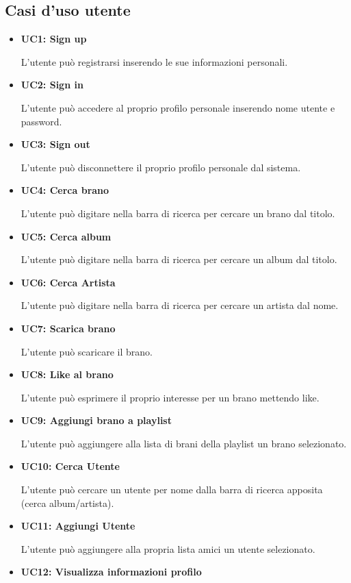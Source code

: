 \subsection{Casi d'uso utente}
\begin{itemize}
      \item \textbf{UC1: Sign up} 
            
      L'utente può registrarsi inserendo le sue informazioni personali.
      \item \textbf{UC2: Sign in}
      
      L'utente può accedere al proprio profilo personale inserendo nome utente e password.
      \item \textbf{UC3: Sign out} 
      
      L'utente può disconnettere il proprio profilo personale dal sistema.     
      \item \textbf{UC4: Cerca brano}
      
      L'utente può digitare nella barra di ricerca per cercare un brano dal titolo.
      \item \textbf{UC5: Cerca album}
      
      L'utente può digitare nella barra di ricerca per cercare un album dal titolo.
      \item \textbf{UC6: Cerca Artista}
      
      L'utente può digitare nella barra di ricerca per cercare un artista dal nome.
      \item \textbf{UC7: Scarica brano}
      
      L'utente può scaricare il brano.
      \item \textbf{UC8: Like al brano} 
      
      L'utente può esprimere il proprio interesse per un brano mettendo like.
      \item \textbf{UC9: Aggiungi brano a playlist}
      
      L'utente può aggiungere alla lista di brani della playlist un brano selezionato.
      \item \textbf{UC10: Cerca Utente} 
      
      L'utente può cercare un utente per nome dalla barra di ricerca apposita (cerca album/artista).
      \item \textbf{UC11: Aggiungi Utente} 
      
      L'utente può aggiungere alla propria lista amici un utente selezionato.
      \item \textbf{UC12: Visualizza informazioni profilo} 
      

\end{itemize}
